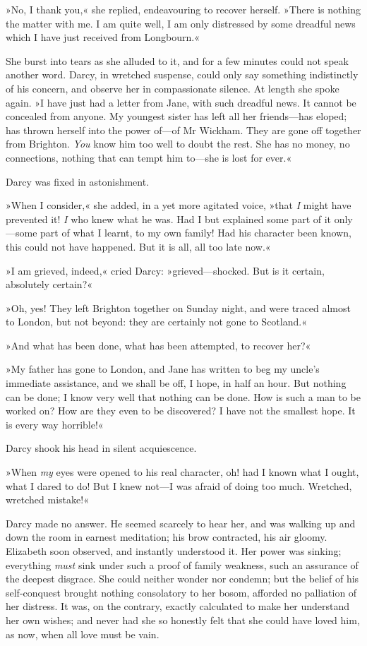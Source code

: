 »No, I thank you,« she replied, endeavouring to recover herself. »There is nothing the matter with me. I am quite well, I am only distressed by some dreadful news which I have just received from Longbourn.«

She burst into tears as she alluded to it, and for a few minutes could not speak another word. Darcy, in wretched suspense, could only say something indistinctly of his concern, and observe her in compassionate silence. At length she spoke again. »I have just had a letter from Jane, with such dreadful news. It cannot be concealed from anyone. My youngest sister has left all her friends—has eloped; has thrown herself into the power of—of Mr Wickham. They are gone off together from Brighton. \textit{You} know him too well to doubt the rest. She has no money, no connections, nothing that can tempt him to—she is lost for ever.«

Darcy was fixed in astonishment.

»When I consider,« she added, in a yet more agitated voice, »that \textit{I} might have prevented it! \textit{I} who knew what he was. Had I but explained some part of it only—some part of what I learnt, to my own family! Had his character been known, this could not have happened. But it is all, all too late now.«

»I am grieved, indeed,« cried Darcy: »grieved—shocked. But is it certain, absolutely certain?«

»Oh, yes! They left Brighton together on Sunday night, and were traced almost to London, but not beyond: they are certainly not gone to Scotland.«

»And what has been done, what has been attempted, to recover her?«

»My father has gone to London, and Jane has written to beg my uncle's immediate assistance, and we shall be off, I hope, in half an hour. But nothing can be done; I know very well that nothing can be done. How is such a man to be worked on? How are they even to be discovered? I have not the smallest hope. It is every way horrible!«

Darcy shook his head in silent acquiescence.

»When \textit{my} eyes were opened to his real character, oh! had I known what I ought, what I dared to do! But I knew not—I was afraid of doing too much. Wretched, wretched mistake!«

Darcy made no answer. He seemed scarcely to hear her, and was walking up and down the room in earnest meditation; his brow contracted, his air gloomy. Elizabeth soon observed, and instantly understood it. Her power was sinking; everything \textit{must} sink under such a proof of family weakness, such an assurance of the deepest disgrace. She could neither wonder nor condemn; but the belief of his self-conquest brought nothing consolatory to her bosom, afforded no palliation of her distress. It was, on the contrary, exactly calculated to make her understand her own wishes; and never had she so honestly felt that she could have loved him, as now, when all love must be vain.

